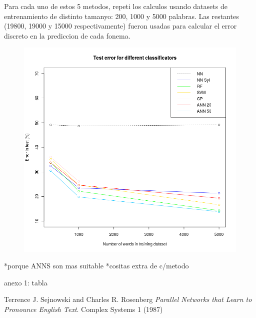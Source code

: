 \documentclass[paper=a4, fontsize=11pt]{scrartcl} %
\numberwithin{equation}{section} %
\numberwithin{figure}{section} %
\numberwithin{table}{section} %
\begin{document}
Para cada uno de estos 5 metodos, repeti los calculos usando datasets de entrenamiento de distinto tamanyo: 200, 1000 y 5000 palabras. Las restantes (19800, 19000 y 15000 respectivamente) fueron usadas para calcular el error discreto en la prediccion de cada fonema.


\newpage

\begin{center}
\begin{figure}[h!]
\includegraphics[width=170mm]{figure.png}
\end{figure}
\end{center}

*porque ANNS son mas suitable
*cositas extra de c/metodo

anexo 1: tabla
\begin{thebibliography}{9}
Terrence J. Sejnowski and Charles R. Rosenberg
\textit{Parallel Networks that Learn to Pronounce English Text}. 
Complex Systems 1 (1987)
 

\end{thebibliography}
\end{document}
